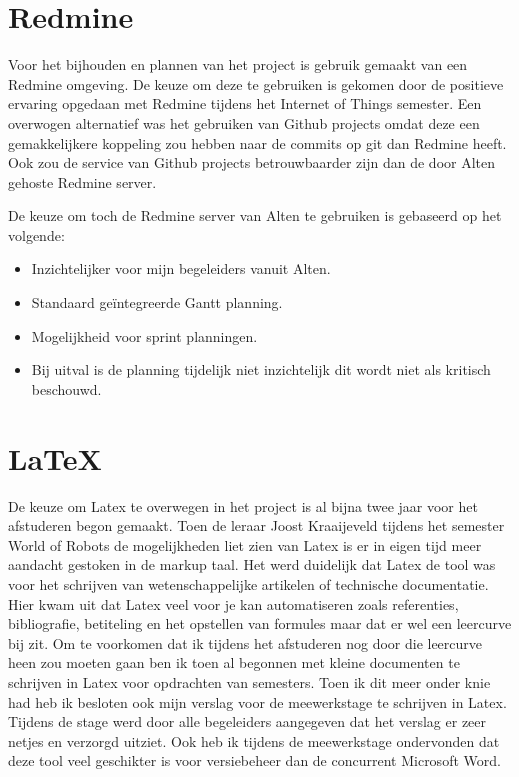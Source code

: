 \documentclass[a4paper, 11pt, oneside]{report}
\begin{document}
\section{Redmine}

Voor het bijhouden en plannen van het project is gebruik gemaakt van een Redmine omgeving. 
De keuze om deze te gebruiken is gekomen door de  positieve ervaring opgedaan met Redmine tijdens het Internet of Things semester.
Een overwogen alternatief was het gebruiken van Github projects omdat deze een gemakkelijkere koppeling zou hebben naar de commits op git dan Redmine heeft. Ook zou de service van Github projects betrouwbaarder zijn dan de door Alten gehoste Redmine server.

De keuze om toch de Redmine server van Alten te gebruiken is gebaseerd op het volgende:
\begin{itemize}
	\item Inzichtelijker voor mijn begeleiders vanuit Alten. 
	\item Standaard geïntegreerde Gantt planning.
	\item Mogelijkheid voor sprint planningen.
	\item Bij uitval is de planning tijdelijk niet inzichtelijk dit wordt niet als kritisch beschouwd.  
\end{itemize}   


\section{\LaTeX}

De keuze om Latex \cite{latex} te overwegen in het project is al bijna twee jaar voor het afstuderen begon gemaakt. 
Toen de leraar Joost Kraaijeveld tijdens het semester World of Robots de mogelijkheden liet zien van Latex is er in eigen tijd meer aandacht gestoken in de markup taal.
Het werd duidelijk dat Latex de tool was voor het schrijven van wetenschappelijke artikelen of technische documentatie.
Hier kwam uit dat Latex veel voor je kan automatiseren zoals referenties, bibliografie, betiteling en het opstellen van formules maar dat er wel een leercurve bij zit.
Om te voorkomen dat ik tijdens het afstuderen nog door die leercurve heen zou moeten gaan ben ik toen al begonnen met kleine documenten te schrijven in Latex voor opdrachten van semesters.
Toen ik dit meer onder knie had heb ik besloten ook mijn verslag voor de meewerkstage te schrijven in Latex.
Tijdens de stage werd door alle begeleiders aangegeven dat het verslag er zeer netjes en verzorgd uitziet.
Ook heb ik tijdens de meewerkstage ondervonden dat deze tool veel geschikter is voor versiebeheer dan de concurrent Microsoft Word.
\end{document}
